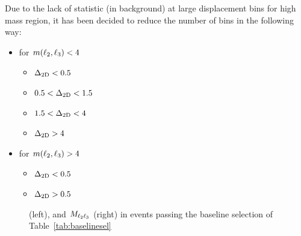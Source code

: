 Due to the lack of statistic (in background) at large displacement bins for high mass region, it has been decided to reduce the number of bins 
in the following way:

\begin{itemize}
\setlength\itemsep{-0.5em}
\item for $m(\ell_2,\ell_3)<4$\GeV
  \begin{itemize}
    \setlength\itemsep{-0.3em}
    \item $\Delta_{\mathrm{2D}}<0.5$\cm
    \item $0.5<\Delta_{\mathrm{2D}}<1.5$\cm
    \item $1.5<\Delta_{\mathrm{2D}}<4$\cm
    \item $\Delta_{\mathrm{2D}}>4$\cm
  \end{itemize}  
\item for $m(\ell_2,\ell_3)>4$\GeV
\begin{itemize}
    \setlength\itemsep{-0.3em}
    \item $\Delta_{\mathrm{2D}}<0.5$\cm
    \item $\Delta_{\mathrm{2D}}>0.5$\cm
  \end{itemize}  
\end{itemize}

\begin{figure}[h]
  \noindent
  \caption{\Deltwod (left), and $M_{\ell_2 \ell_3}$ (right) in events
    passing the baseline selection of Table~\ref{tab:baselinesel}}
  \label{fig:reco_displ}
\end{figure}


